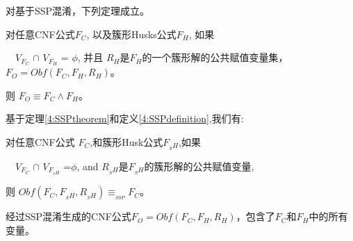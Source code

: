 对基于SSP混淆，下列定理成立。

%
%
%

\begin{theorem}\label{4:SSPtheorem}

对任意CNF公式$F_C$, 以及簇形Husks公式$F_H$, 如果

~~$V_{F_C}$ $\cap$ $V_{F_H}$ = $\phi$, 并且
$R_H$是$F_H$的一个簇形解的公共赋值变量集，
$F_O=Obf(F_C,F_H,R_H)$。

则 $F_O \equiv F_C \wedge F_H  $。
\end{theorem}

基于定理\ref{4:SSPtheorem}和定义\ref{4:SSPdefinition},我们有:
\begin{theorem}\label{4:SSPinference}
对任意CNF公式 $F_C$,和簇形Husk公式$F_{_SH}$,如果

~~$V_{F_C}$ $\cap$ $V_{F_{_SH}}$ =$\phi$, and
$R_{_SH}$是$F_{_SH}$的簇形解的公共赋值变量,

则 $Obf(F_C,F_{_SH},R_{_SH}) \equiv_{_{SSP}} F_C$。
\end{theorem}



经过SSP混淆生成的CNF公式$F_O=Obf(F_C,F_H,R_H)$，包含了$F_C$和$F_H$中的所有变量。

